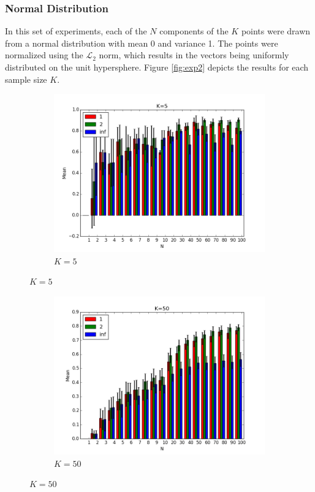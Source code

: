 \documentclass{article}
\begin{document}
\subsubsection{Normal Distribution}
In this set of experiments, each of the $N$ components of the $K$ points were drawn from a normal distribution with mean 0 and variance 1. The points were normalized using the $\mathcal{L}_2$ norm, which results in the vectors being uniformly distributed on the unit hypersphere. Figure \ref{fig:exp2} depicts the results for each sample size $K$.
\begin{figure}[H]
    \centering
    \begin{subfigure}[h]{.8\textwidth}
        \includegraphics[width=\textwidth]{l-experiment2-5-inf.png}
        \caption{$K=5$}
        \label{fig:exp2k5}
    \end{subfigure}
\end{figure}
\begin{figure}[H]
\centering
   \ContinuedFloat
   \begin{subfigure}[h]{.8\textwidth}
        \includegraphics[width=\textwidth]{l-experiment2-50-inf.png}
        \caption{$K=50$}
        \label{fig:exp2k50}
    \end{subfigure}
   \centering
\end{figure}
\end{document}
